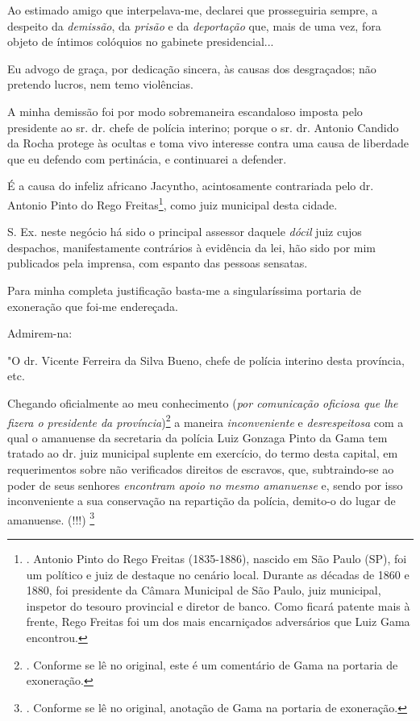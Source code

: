 Ao estimado amigo que interpelava-me, declarei que prosseguiria sempre,
a despeito da \emph{demissão}, da \emph{prisão} e da \emph{deportação}
que, mais de uma vez, fora objeto de íntimos colóquios no gabinete
presidencial...

Eu advogo de graça, por dedicação sincera, às causas dos desgraçados;
não pretendo lucros, nem temo violências.

A minha demissão foi por modo sobremaneira escandaloso imposta pelo
presidente ao sr. dr. chefe de polícia interino; porque o sr. dr.
Antonio Candido da Rocha protege às ocultas e toma vivo interesse contra
uma causa de liberdade que eu defendo com pertinácia, e continuarei a
defender.

É a causa do infeliz africano Jacyntho, acintosamente contrariada pelo
dr. Antonio Pinto do Rego Freitas\footnote{. Antonio Pinto do Rego
  Freitas (1835-1886), nascido em São Paulo (SP), foi um político e juiz
  de destaque no cenário local. Durante as décadas de 1860 e 1880, foi
  presidente da Câmara Municipal de São Paulo, juiz municipal, inspetor
  do tesouro provincial e diretor de banco. Como ficará patente mais à
  frente, Rego Freitas foi um dos mais encarniçados adversários que Luiz
  Gama encontrou.}, como juiz municipal desta cidade.

S. Ex. neste negócio há sido o principal assessor daquele \emph{dócil}
juiz cujos despachos, manifestamente contrários à evidência da lei, hão
sido por mim publicados pela imprensa, com espanto das pessoas sensatas.

Para minha completa justificação basta-me a singularíssima portaria de
exoneração que foi-me endereçada.

Admirem-na:

"O dr. Vicente Ferreira da Silva Bueno, chefe de polícia interino desta
província, etc.

Chegando oficialmente ao meu conhecimento (\emph{por comunicação
oficiosa que lhe fizera o presidente da província})\footnote{. Conforme
  se lê no original, este é um comentário de Gama na portaria de
  exoneração.} a maneira \emph{inconveniente} e \emph{desrespeitosa} com
a qual o amanuense da secretaria da polícia Luiz Gonzaga Pinto da Gama
tem tratado ao dr. juiz municipal suplente em exercício, do termo desta
capital, em requerimentos sobre não verificados direitos de escravos,
que, subtraindo-se ao poder de seus senhores \emph{encontram apoio no
mesmo amanuense} e, sendo por isso inconveniente a sua conservação na
repartição da polícia, demito-o do lugar de amanuense. (!!!) \footnote{.
  Conforme se lê no original, anotação de Gama na portaria de
  exoneração.}

